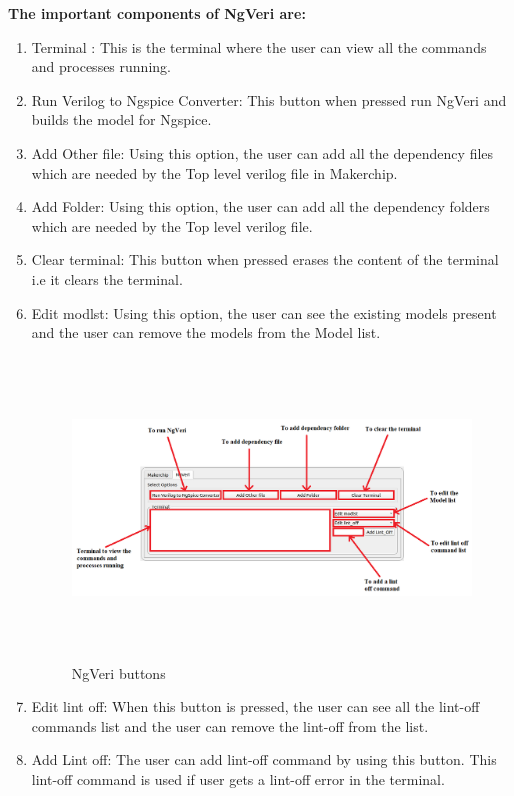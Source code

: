 \noindent \textbf{The important components of NgVeri are:}

\begin{enumerate}

\item Terminal : This is the terminal where the user can view all the commands and processes running. 

\item Run Verilog to Ngspice Converter: This button when pressed run NgVeri and builds the model for Ngspice. 

\item Add Other file: Using this option, the user can add all the dependency files which are needed by the Top level verilog file in Makerchip.

\item Add Folder: Using this option, the user can add all the dependency folders which are needed by the Top level verilog file.

\item Clear terminal: This button when pressed erases the content of the terminal i.e it clears the terminal.

\item Edit modlst: Using this option, the user can see the existing models present and the user can remove the models from the Model list. 

\begin{figure}[H]
\centering
\includegraphics[width = 15cm, height = 8cm]{./NgVeri/ngveributtons.png}
\caption{NgVeri buttons}
\label{ngveributtons}
\end{figure}

\item Edit lint off:  When this button is pressed, the user can see all the lint-off commands list and the user can remove the lint-off from the list. 

\item Add Lint off: The user can add lint-off command by using this button. This lint-off command is used if user gets a lint-off error in the terminal.

\end{enumerate}

